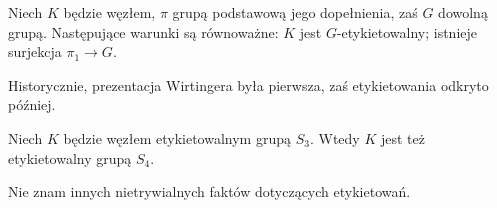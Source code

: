\begin{proposition}
    Niech $K$ będzie węzłem, $\pi$ grupą podstawową jego dopełnienia, zaś $G$ dowolną grupą.
    Następujące warunki są równoważne: $K$ jest $G$-etykietowalny; istnieje surjekcja $\pi_1 \to G$.
\end{proposition}

Historycznie, prezentacja Wirtingera była pierwsza, zaś etykietowania odkryto później.

\begin{proposition}[Perko]
    Niech $K$ będzie węzłem etykietowalnym grupą $S_3$.
    Wtedy $K$ jest też etykietowalny grupą $S_4$.
\end{proposition}

Nie znam innych nietrywialnych faktów dotyczących etykietowań.

